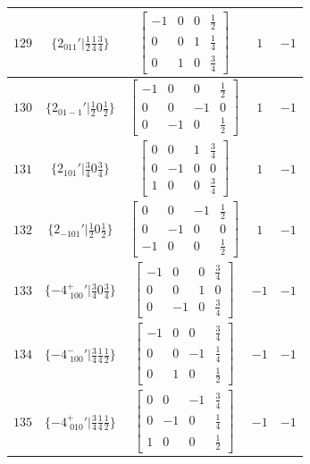 \documentclass[fleqn,8pt]{jsarticle}
\begin{document}
\begin{longtable}{ccccc}
$ 129 $ & $ \{2{}_{011}{}'|\frac{1}{2} \frac{1}{4} \frac{3}{4}\} $ & $ \begin{bmatrix} -1 & 0 & 0 & \frac{1}{2} \\ 0 & 0 & 1 & \frac{1}{4} \\ 0 & 1 & 0 & \frac{3}{4} \end{bmatrix} $ & $ 1 $ & $ -1 $ \\ \hline
$ 130 $ & $ \{2{}_{01-1}{}'|\frac{1}{2} 0 \frac{1}{2}\} $ & $ \begin{bmatrix} -1 & 0 & 0 & \frac{1}{2} \\ 0 & 0 & -1 & 0 \\ 0 & -1 & 0 & \frac{1}{2} \end{bmatrix} $ & $ 1 $ & $ -1 $ \\ \hline
$ 131 $ & $ \{2{}_{101}{}'|\frac{3}{4} 0 \frac{3}{4}\} $ & $ \begin{bmatrix} 0 & 0 & 1 & \frac{3}{4} \\ 0 & -1 & 0 & 0 \\ 1 & 0 & 0 & \frac{3}{4} \end{bmatrix} $ & $ 1 $ & $ -1 $ \\ \hline
$ 132 $ & $ \{2{}_{-101}{}'|\frac{1}{2} 0 \frac{1}{2}\} $ & $ \begin{bmatrix} 0 & 0 & -1 & \frac{1}{2} \\ 0 & -1 & 0 & 0 \\ -1 & 0 & 0 & \frac{1}{2} \end{bmatrix} $ & $ 1 $ & $ -1 $ \\ \hline
$ 133 $ & $ \{-4^{+}_{\,\,100}{}'|\frac{3}{4} 0 \frac{3}{4}\} $ & $ \begin{bmatrix} -1 & 0 & 0 & \frac{3}{4} \\ 0 & 0 & 1 & 0 \\ 0 & -1 & 0 & \frac{3}{4} \end{bmatrix} $ & $ -1 $ & $ -1 $ \\ \hline
$ 134 $ & $ \{-4^{-}_{\,\,100}{}'|\frac{3}{4} \frac{1}{4} \frac{1}{2}\} $ & $ \begin{bmatrix} -1 & 0 & 0 & \frac{3}{4} \\ 0 & 0 & -1 & \frac{1}{4} \\ 0 & 1 & 0 & \frac{1}{2} \end{bmatrix} $ & $ -1 $ & $ -1 $ \\ \hline
$ 135 $ & $ \{-4^{+}_{\,\,010}{}'|\frac{3}{4} \frac{1}{4} \frac{1}{2}\} $ & $ \begin{bmatrix} 0 & 0 & -1 & \frac{3}{4} \\ 0 & -1 & 0 & \frac{1}{4} \\ 1 & 0 & 0 & \frac{1}{2} \end{bmatrix} $ & $ -1 $ & $ -1 $ \\ \hline

\end{longtable}
\end{document}
